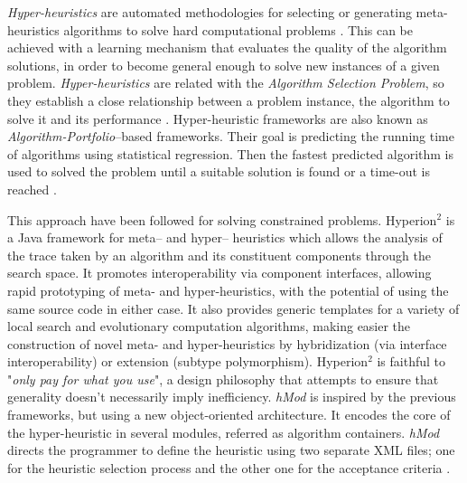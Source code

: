 \textit{Hyper-heuristics} are automated methodologies for selecting or generating meta-heuristics algorithms to solve hard computational problems \cite{Chakhlevitch2008}. This can be achieved with a learning mechanism that evaluates the quality of the algorithm solutions, in order to become general enough to solve new instances of a given problem. \textit{Hyper-heuristics} are related with the \textit{Algorithm Selection Problem}, so they establish a close relationship between a problem instance, the algorithm to solve it and its performance \cite{Ryser-welch}. Hyper-heuristic frameworks are also known as \textit{Algorithm-Portfolio}--based frameworks. Their goal is predicting the running time of algorithms using statistical regression. Then the fastest predicted algorithm is used to solved the problem until a suitable solution is found or a time-out is reached \cite{Leyton-Brown2003}.

This approach have been followed for solving constrained problems. {\sc Hyperion}$^2$ \cite{Brownlee2014} is a Java framework for meta-- and hyper-- heuristics which allows the analysis of the trace taken by an algorithm and its constituent components through the search space. It promotes interoperability via component interfaces, allowing rapid prototyping of meta- and hyper-heuristics, with the potential of using the same source code in either case. It also provides generic templates for a variety of local search and evolutionary computation algorithms, making easier the construction of novel meta- and hyper-heuristics by hybridization (via interface interoperability) or extension (subtype polymorphism). {\sc Hyperion}$^2$ is faithful to "{\it only pay for what you use}", a design philosophy that attempts to ensure that generality doesn't necessarily imply inefficiency. \textit{hMod} is inspired by the previous frameworks, but using a new object-oriented architecture. It encodes the core of the hyper-heuristic in several modules, referred as algorithm containers. \textit{hMod} directs the programmer to define the heuristic using two separate XML files; one for the heuristic selection process and the other one for the acceptance criteria \cite{Urra2013}.

